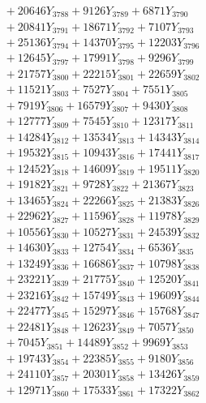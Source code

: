 \documentclass[a4paper,10pt]{article}
\begin{document}
{\begin{align}
&\;  + 20646 Y_{3788} + 9126 Y_{3789} + 6871 Y_{3790} \\[0.3ex]
&\;  + 20841 Y_{3791} + 18671 Y_{3792} + 7107 Y_{3793} \\[0.3ex]
&\;  + 25136 Y_{3794} + 14370 Y_{3795} + 12203 Y_{3796} \\[0.3ex]
&\;  + 12645 Y_{3797} + 17991 Y_{3798} + 9296 Y_{3799} \\[0.3ex]
&\;  + 21757 Y_{3800} + 22215 Y_{3801} + 22659 Y_{3802} \\[0.3ex]
&\;  + 11521 Y_{3803} + 7527 Y_{3804} + 7551 Y_{3805} \\[0.3ex]
&\;  + 7919 Y_{3806} + 16579 Y_{3807} + 9430 Y_{3808} \\[0.5ex]\allowbreak
&\;  + 12777 Y_{3809} + 7545 Y_{3810} + 12317 Y_{3811} \\[0.3ex]
&\;  + 14284 Y_{3812} + 13534 Y_{3813} + 14343 Y_{3814} \\[0.3ex]
&\;  + 19532 Y_{3815} + 10943 Y_{3816} + 17441 Y_{3817} \\[0.3ex]
&\;  + 12452 Y_{3818} + 14609 Y_{3819} + 19511 Y_{3820} \\[0.3ex]
&\;  + 19182 Y_{3821} + 9728 Y_{3822} + 21367 Y_{3823} \\[0.3ex]
&\;  + 13465 Y_{3824} + 22266 Y_{3825} + 21383 Y_{3826} \\[0.3ex]
&\;  + 22962 Y_{3827} + 11596 Y_{3828} + 11978 Y_{3829} \\[0.3ex]
&\;  + 10556 Y_{3830} + 10527 Y_{3831} + 24539 Y_{3832} \\[0.3ex]
&\;  + 14630 Y_{3833} + 12754 Y_{3834} + 6536 Y_{3835} \\[0.3ex]
&\;  + 13249 Y_{3836} + 16686 Y_{3837} + 10798 Y_{3838} \\[0.5ex]\allowbreak
&\;  + 23221 Y_{3839} + 21775 Y_{3840} + 12520 Y_{3841} \\[0.3ex]
&\;  + 23216 Y_{3842} + 15749 Y_{3843} + 19609 Y_{3844} \\[0.3ex]
&\;  + 22477 Y_{3845} + 15297 Y_{3846} + 15768 Y_{3847} \\[0.3ex]
&\;  + 22481 Y_{3848} + 12623 Y_{3849} + 7057 Y_{3850} \\[0.3ex]
&\;  + 7045 Y_{3851} + 14489 Y_{3852} + 9969 Y_{3853} \\[0.3ex]
&\;  + 19743 Y_{3854} + 22385 Y_{3855} + 9180 Y_{3856} \\[0.3ex]
&\;  + 24110 Y_{3857} + 20301 Y_{3858} + 13426 Y_{3859} \\[0.3ex]
&\;  + 12971 Y_{3860} + 17533 Y_{3861} + 17322 Y_{3862} \\[0.3ex]

\end{align}}
\end{document}
